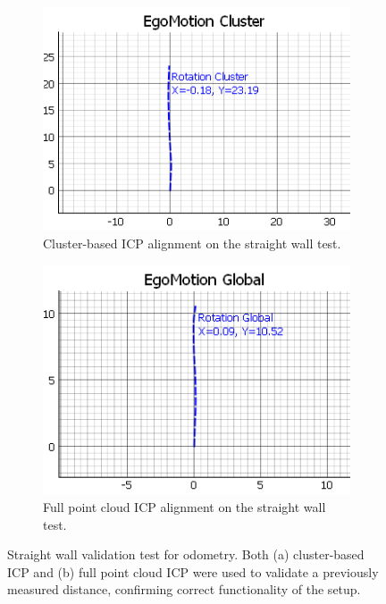 \begin{figure}[!htbp]
    \centering
    \begin{subfigure}{0.48\linewidth}
        \centering
        \includegraphics[width=\linewidth]{images/straightWallCluster_ICP.png}
        \caption{Cluster-based ICP alignment on the straight wall test.}
        \label{fig:straightWall_Clustered}
    \end{subfigure}
    \hfill
    \begin{subfigure}{0.48\linewidth}
        \centering
        \includegraphics[width=\linewidth]{images/straightWallFull_ICP.png}
        \caption{Full point cloud ICP alignment on the straight wall test.}
        \label{fig:straightWall_FullICP}
    \end{subfigure}
    \caption{Straight wall validation test for odometry.  
    Both (a) cluster-based ICP and (b) full point cloud ICP were used to validate a previously measured distance, confirming correct functionality of the setup.}
    \label{fig:straightWall_Test}
\end{figure}

